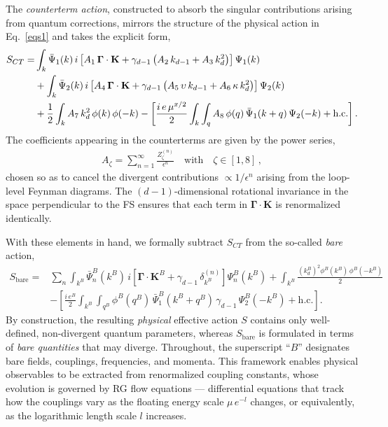 The \textit{counterterm action}, constructed to absorb the singular 
contributions arising from quantum corrections, mirrors the structure of 
the physical action in Eq.~\eqref{eqs1} and takes the explicit form,
\begin{align}
\label{actcount}
S_{CT}  = &     \int_k \bar \Psi_1  (k) \,i
\left [ A_1\, \mathbf  \Gamma \cdot \mathbf  K  + 
\gamma_{d-1} \left( A_2 \, k_{d-1} + A_3\,k_d^2 \right)
 \right  ] \Psi_1 (k)  
 \nonumber \\ & +  \int_k \bar \Psi_2  (k) \,i
\left [ A_4 \, \mathbf  \Gamma \cdot \mathbf  K  +  \gamma_{d-1} \left(
A_5 \, \upsilon \,k_{d-1} 
+ A_6 \, \kappa \, k_d^2  \right) \right  ] \Psi_2 (k)  
 \nonumber \\ & + \frac{1}{2} \int_k A_7 \, k_d^2 \,  \phi (k) \, \phi(-k) 
- \left[ \frac{ i\, e \, \mu^{x/2} } {2} 
\int_{k} \int_q A_8 \, \phi (q) \,
 \bar{\Psi}_1 (k+q) \, {\Psi}_2(-k) 
+ \text{h.c.} \right ].
\end{align}
The coefficients appearing in the counterterms are given by the power 
series,
\begin{align}
A_{\zeta} = \sum_{n=1}^\infty \frac{Z^{(n)}_{\zeta}}{\epsilon^n} 
\quad \text{with} \quad \zeta \in [1, 8]\,,
\end{align}
chosen so as to cancel the divergent contributions $\propto 1/\epsilon^n$ 
arising from the loop-level Feynman diagrams. The $(d-1)$-dimensional 
rotational invariance in the space perpendicular to the FS ensures that 
each term in $\boldsymbol{\Gamma} \cdot \mathbf{K}$ is renormalized 
identically.


With these elements in hand, we formally subtract $S_{CT}$ from the 
so-called \textit{bare} action,
\begin{align}
\label{actren}
S_{\text{bare}} = & \sum_n \int_{k^B} \bar{\Psi}^B_n(k^B)
\, i \left[\boldsymbol{\Gamma} \cdot \mathbf{K}^B 
+ \gamma_{d-1}\,\delta^{(n)}_{k^B}\right] \Psi^B_n(k^B)
+ \int_{k^B} \frac{\left(k^B_d\right)^2 
\phi^B(k^B)\,\phi^B(-k^B)}{2} \nonumber \\
& - \left[\frac{i\,e^B}{2} \int_{k^B} \int_{q^B} \phi^B(q^B)\,
\bar{\Psi}^B_1(k^B+q^B)\,\gamma_{d-1}\,\Psi^B_2(-k^B) 
+ \text{h.c.}\right].
\end{align}
By construction, the resulting \textit{physical} effective action $S$ 
contains only well-defined, non-divergent quantum parameters, whereas 
$S_{\text{bare}}$ is formulated in terms of \textit{bare quantities} 
that may diverge. Throughout, the superscript ``$B$'' designates bare 
fields, couplings, frequencies, and momenta. This framework enables 
physical observables to be extracted from renormalized coupling constants, 
whose evolution is governed by RG flow equations --- differential 
equations that track how the couplings vary as the floating energy scale 
$\mu\,e^{-l}$ changes, or equivalently, as the logarithmic length scale 
$l$ increases.

